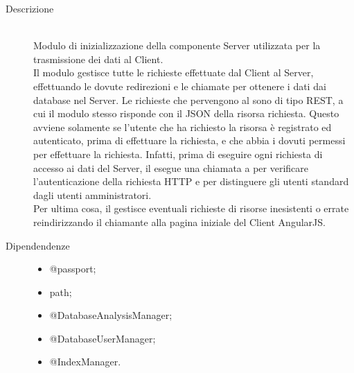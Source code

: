 \begin{description}
 \item[Descrizione] \hfill \\
Modulo di inizializzazione della componente Server utilizzata per la trasmissione dei dati al Client. \\
Il modulo  gestisce tutte le richieste effettuate dal Client al Server, effettuando le dovute redirezioni e le chiamate per ottenere i dati dai database nel Server. Le richieste che pervengono al 
 sono di tipo REST, a cui il modulo stesso risponde con il JSON della risorsa richiesta. 
Questo avviene solamente se l'utente che ha richiesto la risorsa è registrato ed autenticato, prima di 
effettuare la richiesta, e che abbia i dovuti permessi per effettuare la richiesta. Infatti, prima di eseguire ogni richiesta di accesso ai dati del Server, il  esegue una chiamata a  per verificare l'autenticazione della richiesta HTTP e per distinguere gli utenti standard dagli utenti amministratori. \\
Per ultima cosa, il  gestisce eventuali richieste di risorse inesistenti o errate reindirizzando il chiamante alla pagina iniziale del Client AngularJS.
 \item[Dipendendenze] \hfill
 \begin{itemize}
 \item @passport;
 \item path;
 \item @DatabaseAnalysisManager;
 \item @DatabaseUserManager;
 \item @IndexManager.
 \end{itemize}
 

\end{description}
